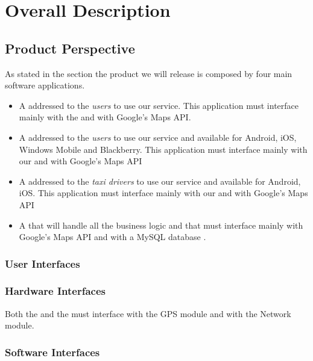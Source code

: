 \section{Overall Description}
\subsection{Product Perspective}
\label{sec:product_perspective}
As stated in the \emph{} section the product we will release is composed by four main software applications.
\begin{itemize}
  \item A \textbf{} addressed to the \emph{users}  to use our service. This application must interface mainly with the \textbf{} and with Google's Maps API.
  \item A \textbf{} addressed to the \emph{users} to use our service and available for Android, iOS, Windows Mobile and Blackberry. This application must interface mainly with our \textbf{} and with Google's Maps API
  \item A \textbf{} addressed to the \emph{taxi drivers} to use our service and available for Android, iOS. This application must interface mainly with our \textbf{} and with Google's Maps API

  \item A \textbf{} that will handle all the business logic and that must interface mainly with Google's Maps API and with a MySQL database .
\end{itemize}

\subsubsection{User Interfaces}
\label{subs:user_interfaces}

\subsubsection{Hardware Interfaces}
\label{subs:hardwareinterfaces}
Both the \textbf{} and the \textbf{} must interface with the GPS module and with the Network module.\\

\subsubsection{Software Interfaces}
\label{subs:softwareinterfaces}


